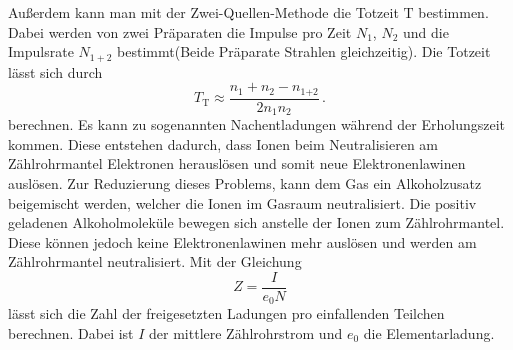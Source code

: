 Außerdem kann man mit der Zwei-Quellen-Methode die Totzeit $\text{T}$ bestimmen. 
Dabei werden von zwei Präparaten die Impulse pro Zeit $N_1$, $N_2$ und die Impulsrate $N_{1+2}$ bestimmt(Beide Präparate Strahlen gleichzeitig).
Die Totzeit lässt sich durch
\begin{equation}
  T_\text{T} \approx \frac{n_1 +n_2 -n_\text{1+2}}{2n_1 n_2} \, .
  \label{eqn:totzeit}
\end{equation}
berechnen.
Es kann zu sogenannten Nachentladungen während der Erholungszeit kommen. Diese entstehen dadurch, dass Ionen beim Neutralisieren am Zählrohrmantel
Elektronen herauslösen und somit neue Elektronenlawinen auslösen. Zur Reduzierung dieses Problems, kann dem Gas ein Alkoholzusatz beigemischt werden, welcher die 
Ionen im Gasraum neutralisiert. Die positiv geladenen Alkoholmoleküle bewegen sich anstelle der Ionen zum Zählrohrmantel. Diese können jedoch keine Elektronenlawinen mehr auslösen und werden am Zählrohrmantel neutralisiert.
Mit der Gleichung 
\begin{equation}
  Z=\frac{I}{e_0 N}
  \label{eqn:zstrom}
\end{equation}
lässt sich die Zahl der freigesetzten Ladungen pro einfallenden Teilchen berechnen. Dabei ist $I$ der mittlere Zählrohrstrom und $e_0$ die Elementarladung.

